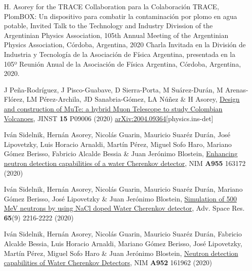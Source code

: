 \begin{etaremune}
\item {} H. Asorey \ifeng for the TRACE Collaboration \else para la Colaboración TRACE\fi, PlomBOX: Un dispositivo para combatir la contaminación por plomo en agua potable, \ifeng Invited Talk to the Technology and Industry Divission of the Argentinian Physics Association, 105th Annual Meeting of the Argentinian Physics Association, Córdoba, Argentina, 2020 \else Charla Invitada en la División de Industria y Tecnología de la Asociación de Física Argentina, presentada en la 105º Reunión Anual de la Asociación de Física Argentina, Córdoba, Argentina, 2020.\fi

\item {} J Peña-Rodríguez, J Pisco-Guabave, D Sierra-Porta, M Suárez-Durán, M Arenas-Flórez, LM Pérez-Archila, JD Sanabria-Gómez, LA Núñez \& H Asorey, \href{https://doi.org/10.1088/1748-0221/15/09/P09006}{{Design and construction of MuTe: a hybrid Muon Telescope to study Colombian Volcanoes}}, JINST {\bf{15}} P09006 (2020) \href{https://arxiv.org/abs/2004.09364}{arXiv:2004.09364}[physics.ins-det]

\item {} Iván Sidelnik, Hernán Asorey, Nicolás Guarin, Mauricio Suaréz Durán, José Lipovetzky, Luis Horacio Arnaldi, Martín Pérez, Miguel Sofo Haro, Mariano Gómez Berisso, Fabricio Alcalde Bessia \& Juan Jerónimo Blostein, \href{https://doi.org/10.1016/j.nima.2019.163172}{{Enhancing neutron detection capabilities of a water Cherenkov detector}}, NIM {\bf{A955}} 163172 (2020) %

\item {} Iván Sidelnik, Hernán Asorey, Nicolás Guarin, Mauricio Suaréz Durán, Mariano Gómez Berisso, José Lipovetzky \& Juan Jerónimo Blostein, \href{https://doi.org/10.1016/j.asr.2020.02.024}{{Simulation of 500 MeV neutrons by using NaCl doped Water Cherenkov detector}}, Adv. Space Res. {\bf{65}}(9) 2216-2222 (2020) %

\item {} Iván Sidelnik, Hernán Asorey, Nicolás Guarin, Mauricio Suaréz Durán, Fabricio Alcalde Bessia, Luis Horacio Arnaldi, Mariano Gómez Berisso, José Lipovetzky, Martín Pérez, Miguel Sofo Haro \& Juan Jerónimo Blostein, \href{https://doi.org/10.1016/j.nima.2019.03.017}{{Neutron detection capabilities of Water Cherenkov Detectors}}, NIM {\bf{A952}} 161962 (2020) %


\end{etaremune}
